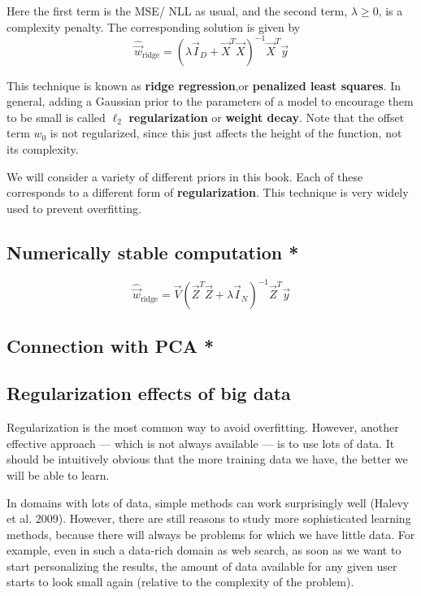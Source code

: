 Here the first term is the MSE/ NLL as usual, and the second term, $\lambda \geq 0$, is a complexity penalty. The corresponding solution is given by
\begin{equation}\label{eqn:Ridge-regression-solution}
\hat{\vec{w}}_{\mathrm{ridge}}=(\lambda\vec{I}_D+\vec{X}^T\vec{X})^{-1}\vec{X}^T\vec{y}
\end{equation}

This technique is known as \textbf{ridge regression},or \textbf{penalized least squares}. In general, adding a Gaussian prior to the parameters of a model to encourage them to be small is called $\ell_2$ \textbf{regularization} or \textbf{weight decay}. Note that the offset term $w_0$ is not regularized, since this just affects the height of the function, not its complexity.

We will consider a variety of different priors in this book. Each of these corresponds to a different form of \textbf{regularization}. This technique is very widely used to prevent overfitting.


\subsection{Numerically stable computation *}

\begin{equation}\label{eqn:Ridge-regression-SVD}
\hat{\vec{w}}_{\mathrm{ridge}}=\vec{V}(\vec{Z}^T\vec{Z}+\lambda\vec{I}_N)^{-1}\vec{Z}^T\vec{y}
\end{equation}


\subsection{Connection with PCA *}


\subsection{Regularization effects of big data}
Regularization is the most common way to avoid overfitting. However, another effective approach — which is not always available — is to use lots of data. It should be intuitively obvious that the more training data we have, the better we will be able to learn.

In domains with lots of data, simple methods can work surprisingly well (Halevy et al. 2009). However, there are still reasons to study more sophisticated learning methods, because there will always be problems for which we have little data. For example, even in such a data-rich domain as web search, as soon as we want to start personalizing the results, the amount of data available for any given user starts to look small again (relative to the complexity of the problem).

